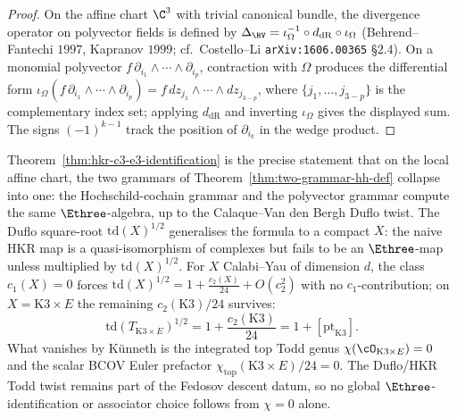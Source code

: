 \begin{proof}
On the affine chart $\C^3$ with trivial canonical bundle, the
divergence operator on polyvector fields is defined by
$\Delta_{\BV} = \iota_\Omega^{-1} \circ d_{\mathrm{dR}} \circ \iota_\Omega$
(Behrend--Fantechi $1997$, Kapranov $1999$; cf.\ Costello--Li \texttt{arXiv:1606.00365} \S$2.4$). On a monomial polyvector
$f\, \partial_{i_1} \wedge \cdots \wedge \partial_{i_p}$, contraction with
$\Omega$ produces the differential form
$\iota_\Omega(f\, \partial_{i_1} \wedge \cdots \wedge \partial_{i_p}) = f\, dz_{j_1} \wedge \cdots \wedge dz_{j_{3 - p}}$,
where $\{j_1, \ldots, j_{3 - p}\}$ is the complementary index set; applying $d_{\mathrm{dR}}$ and inverting $\iota_\Omega$ gives the displayed sum. The signs $(-1)^{k - 1}$ track the position of $\partial_{i_k}$ in the wedge product.
\end{proof}

\begin{remark}
\label{rem:polyvector-vs-hochschild-grammar}
Theorem~\ref{thm:hkr-c3-e3-identification} is the precise statement
that on the local affine chart, the two grammars of
Theorem~\ref{thm:two-grammar-hh-def} collapse into one: the
Hochschild-cochain grammar and the polyvector grammar compute the same
$\Ethree$-algebra, up to the Calaque--Van den Bergh Duflo twist. The
Duflo square-root $\mathrm{td}(X)^{1/2}$ generalises the formula to a
compact $X$: the naive HKR map is a quasi-isomorphism of complexes
but fails to be an $\Ethree$-map unless multiplied by $\mathrm{td}(X)^{1/2}$.
For $X$ Calabi--Yau of dimension $d$, the class $c_1(X)=0$ forces
$\mathrm{td}(X)^{1/2}=1+\tfrac{c_2(X)}{24}+O(c_2^2)$ with no
$c_1$-contribution; on $X=\mathrm K3\times E$ the remaining
$c_2(\mathrm K3)/24$ survives:
\[
 \mathrm{td}(T_{\mathrm K3\times E})^{1/2}
 =1+\frac{c_2(\mathrm K3)}{24}=1+[\mathrm{pt}_{\mathrm K3}].
\]
What vanishes by K\"unneth is the integrated top Todd genus
$\chi(\cO_{\mathrm K3\times E})=0$ and the scalar BCOV Euler prefactor
$\chi_{\mathrm{top}}(\mathrm K3\times E)/24=0$.  The Duflo/HKR Todd
twist remains part of the Fedosov descent datum, so no global
$\Ethree$-identification or associator choice follows from
$\chi=0$ alone.
\end{remark}

